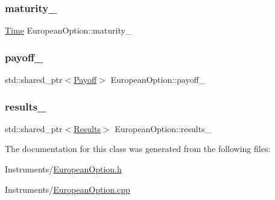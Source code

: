 \subsubsection{\texorpdfstring{maturity\+\_\+}{maturity\_}}
{\footnotesize\ttfamily \hyperlink{_name_def_8h_ac2d3e0ba793497bcca555c7c2cf64ff3}{Time} European\+Option\+::maturity\+\_\+\hspace{0.3cm}{\ttfamily [private]}}

\hypertarget{class_european_option_a3d597cb0b811f69a08e49b1af13b5a04}{}\label{class_european_option_a3d597cb0b811f69a08e49b1af13b5a04} 
\subsubsection{\texorpdfstring{payoff\+\_\+}{payoff\_}}
{\footnotesize\ttfamily std\+::shared\+\_\+ptr$<$\hyperlink{class_payoff}{Payoff}$>$ European\+Option\+::payoff\+\_\+\hspace{0.3cm}{\ttfamily [private]}}

\hypertarget{class_european_option_a228f13a5ce4c46caef1e3052b4a27610}{}\label{class_european_option_a228f13a5ce4c46caef1e3052b4a27610} 
\subsubsection{\texorpdfstring{results\+\_\+}{results\_}}
{\footnotesize\ttfamily std\+::shared\+\_\+ptr$<$\hyperlink{class_european_option_1_1_results}{Results}$>$ European\+Option\+::results\+\_\+\hspace{0.3cm}{\ttfamily [private]}}



The documentation for this class was generated from the following files\+:\begin{DoxyCompactItemize}
\item 
Instruments/\hyperlink{_european_option_8h}{European\+Option.\+h}\item 
Instruments/\hyperlink{_european_option_8cpp}{European\+Option.\+cpp}\end{DoxyCompactItemize}

